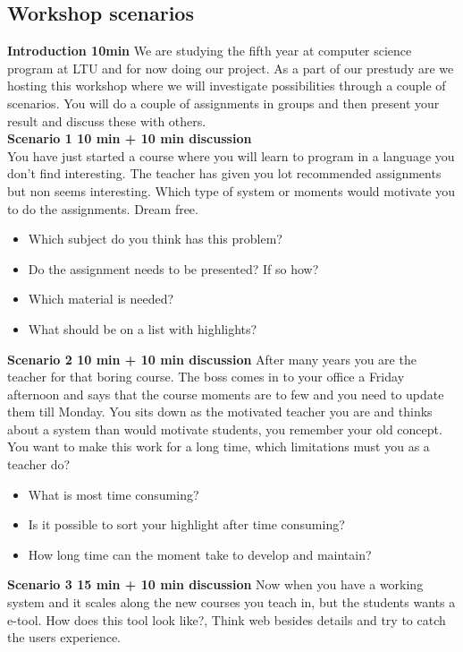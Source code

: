 \subsection{Workshop scenarios}\label{Worskshop:senarios}
\textbf{Introduction 10min}
We are studying the fifth year at computer science program at LTU and for now doing our project. As a part of our prestudy are we hosting this workshop where we will investigate possibilities through a couple of scenarios. You will do a couple of assignments in groups and then present your result and discuss these with others.\\

\textbf{Scenario 1 10 min + 10 min discussion}\\
You have just started a course where you will learn to program in a language you don't find interesting. The teacher has given you lot recommended assignments but non seems interesting. Which type of system or moments would motivate you to do the assignments. Dream free.
\begin{itemize}
\item Which subject do you think has this problem?
\item Do the assignment needs to be presented? If so how?
\item Which material is needed?
\item What should be on a list with highlights?
\end{itemize} 

\textbf{Scenario 2 10 min + 10 min discussion}
After many years you are the teacher for that boring course. The boss comes in to your office a Friday afternoon and says that the course moments are to few and you need to update them till Monday. You sits down as the motivated teacher you are and thinks about a system than would motivate students, you remember your old concept. \\
You want to make this work for a long time, which limitations must you as a teacher do?\\
\begin{itemize}
\item What is most time consuming?
\item Is it possible to sort your highlight after time consuming?
\item How long time can the moment take to develop and maintain?
\end{itemize} 

\textbf{Scenario 3 15 min + 10 min discussion}
Now when you have a working system and it scales along the new courses you teach in, but the students wants a e-tool. How does this tool look like?, Think web besides details and try to catch the users experience.

